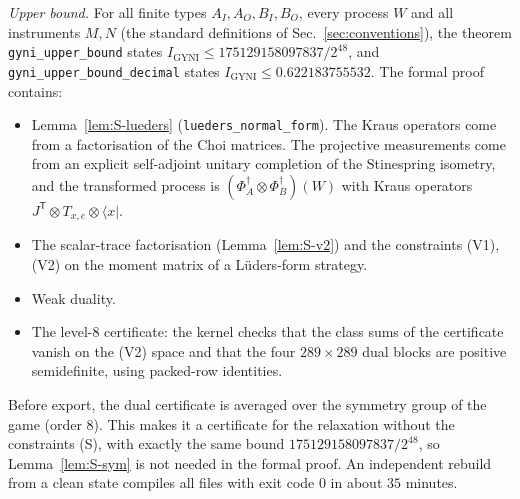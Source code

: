 \documentclass[aps,pra,onecolumn,notitlepage,superscriptaddress,longbibliography,nofootinbib,11pt]{revtex4-2}
\theoremstyle{remark}
\newcommand{\tp}{\mathsf{T}}
\newcommand{\Igy}{I_{\mathrm{GYNI}}}
\begin{document}
\emph{Upper bound.} For all finite types $A_I,A_O,B_I,B_O$, every process $W$ and all instruments $M,N$ (the standard definitions of Sec.~\ref{sec:conventions}), the theorem \texttt{gyni\_upper\_bound} states $\Igy\le175129158097837/2^{48}$, and \texttt{gyni\_upper\_bound\_decimal} states $\Igy\le0.622183755532$. The formal proof contains:
\begin{itemize}
\item Lemma~\ref{lem:S-lueders} (\texttt{lueders\_normal\_form}). The Kraus operators come from a factorisation of the Choi matrices. The projective measurements come from an explicit self-adjoint unitary completion of the Stinespring isometry, and the transformed process is $(\Phi_A^\dagger\otimes\Phi_B^\dagger)(W)$ with Kraus operators $J^{\tp}\otimes T_{x,e}\otimes\langle x|$.
\item The scalar-trace factorisation (Lemma~\ref{lem:S-v2}) and the constraints (V1), (V2) on the moment matrix of a L\"uders-form strategy.
\item Weak duality.
\item The level-8 certificate: the kernel checks that the class sums of the certificate vanish on the (V2) space and that the four $289\times289$ dual blocks are positive semidefinite, using packed-row identities.
\end{itemize}
Before export, the dual certificate is averaged over the symmetry group of the game (order 8). This makes it a certificate for the relaxation without the constraints (S), with exactly the same bound $175129158097837/2^{48}$, so Lemma~\ref{lem:S-sym} is not needed in the formal proof. An independent rebuild from a clean state compiles all files with exit code 0 in about $35$ minutes.
\end{document}
